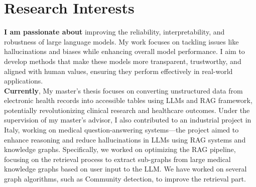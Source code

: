 \documentclass[letterpaper,11pt]{article}
\newcommand{\resumeSubHeadingListStart}{\begin{itemize}[leftmargin=0.0in, label={}]}
\newcommand{\resumeSubHeadingListEnd}{\end{itemize}}
\begin{document}
	\section{\textcolor{title-color}{Research Interests}}
	\textbf{I am passionate about} improving the reliability, interpretability, and robustness of large language models. My work focuses on tackling issues like hallucinations and biases while enhancing overall model performance. I aim to develop methods that make these models more transparent, trustworthy, and aligned with human values, ensuring they perform effectively in real-world applications.
	\\\textbf{Currently}, My master’s thesis focuses on converting unstructured data from electronic health records into accessible tables using LLMs and RAG framework, potentially revolutionizing clinical research and healthcare outcomes. Under the supervision of my master’s advisor, I also contributed to an industrial project in Italy, working on medical question-answering systems—the project aimed to enhance reasoning and reduce hallucinations in LLMs using RAG systems and knowledge graphs. Specifically, we worked on optimizing the RAG pipeline, focusing on the retrieval process to extract sub-graphs from large medical knowledge graphs based on user input to the LLM. We have worked on several graph algorithms, such as Community detection, to improve the retrieval part.
	
	
	
\end{document}
